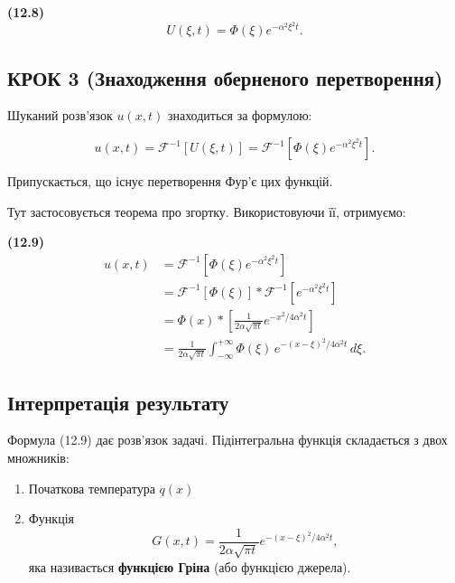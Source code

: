 \textbf{(12.8)} \[
U(\xi,t)=\Phi(\xi)e^{-\alpha^2\xi^2 t}.
\]

\subsection{КРОК 3 (Знаходження оберненого перетворення)}\label{ux43aux440ux43eux43a-3-ux437ux43dux430ux445ux43eux434ux436ux435ux43dux43dux44f-ux43eux431ux435ux440ux43dux435ux43dux43eux433ux43e-ux43fux435ux440ux435ux442ux432ux43eux440ux435ux43dux43dux44f}

Шуканий розв'язок \(u(x,t)\) знаходиться за формулою:

\[
u(x, t) = \mathcal{F}^{-1}\!\left[U(\xi, t)\right]
= \mathcal{F}^{-1}\!\left[\Phi(\xi)e^{-\alpha^2 \xi^2 t}\right].
\]

Припускається, що існує перетворення Фур'є цих функцій.

Тут застосовується теорема про згортку. Використовуючи її, отримуємо:

\textbf{(12.9)} \[
\begin{aligned}
u(x, t)
&= \mathcal{F}^{-1}\!\left[\Phi(\xi)e^{-\alpha^{2}\xi^{2} t}\right] \\
&= \mathcal{F}^{-1}\!\left[\Phi(\xi)\right] * \mathcal{F}^{-1}\!\left[e^{-\alpha^{2}\xi^{2} t}\right] \\
&= \Phi(x) * \left[\frac{1}{2\alpha \sqrt{\pi t}} e^{-x^{2}/4\alpha^{2} t}\right] \\
&= \frac{1}{2\alpha \sqrt{\pi t}} \int_{-\infty}^{+\infty} \Phi(\xi)\,e^{-(x-\xi)^{2}/4\alpha^{2} t}\,d\xi.
\end{aligned}
\]

\subsection{Інтерпретація результату}\label{ux456ux43dux442ux435ux440ux43fux440ux435ux442ux430ux446ux456ux44f-ux440ux435ux437ux443ux43bux44cux442ux430ux442ux443}

Формула (12.9) дає розв'язок задачі. Підінтегральна функція складається з двох множників:

\begin{enumerate}
\def\labelenumi{\arabic{enumi}.}
\tightlist
\item
  Початкова температура \(q(x)\)\\
\item
  Функція\\
  \[
  G(x, t) = \frac{1}{2\alpha \sqrt{\pi t}} e^{-(x-\xi)^2/4\alpha^2 t},
  \] яка називається \textbf{функцією Гріна} (або функцією джерела).
\end{enumerate}

